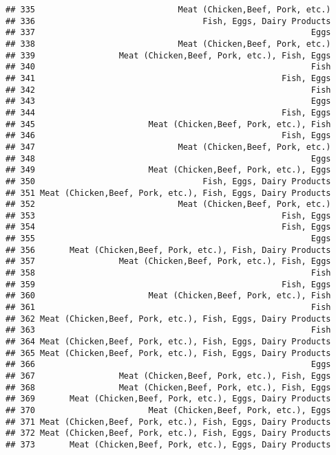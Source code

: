 \documentclass[
]{article}
\begin{document}
\begin{verbatim}
## 335                             Meat (Chicken,Beef, Pork, etc.)
## 336                                  Fish, Eggs, Dairy Products
## 337                                                        Eggs
## 338                             Meat (Chicken,Beef, Pork, etc.)
## 339                 Meat (Chicken,Beef, Pork, etc.), Fish, Eggs
## 340                                                        Fish
## 341                                                  Fish, Eggs
## 342                                                        Fish
## 343                                                        Eggs
## 344                                                  Fish, Eggs
## 345                       Meat (Chicken,Beef, Pork, etc.), Fish
## 346                                                  Fish, Eggs
## 347                             Meat (Chicken,Beef, Pork, etc.)
## 348                                                        Eggs
## 349                       Meat (Chicken,Beef, Pork, etc.), Eggs
## 350                                  Fish, Eggs, Dairy Products
## 351 Meat (Chicken,Beef, Pork, etc.), Fish, Eggs, Dairy Products
## 352                             Meat (Chicken,Beef, Pork, etc.)
## 353                                                  Fish, Eggs
## 354                                                  Fish, Eggs
## 355                                                        Eggs
## 356       Meat (Chicken,Beef, Pork, etc.), Fish, Dairy Products
## 357                 Meat (Chicken,Beef, Pork, etc.), Fish, Eggs
## 358                                                        Fish
## 359                                                  Fish, Eggs
## 360                       Meat (Chicken,Beef, Pork, etc.), Fish
## 361                                                        Fish
## 362 Meat (Chicken,Beef, Pork, etc.), Fish, Eggs, Dairy Products
## 363                                                        Fish
## 364 Meat (Chicken,Beef, Pork, etc.), Fish, Eggs, Dairy Products
## 365 Meat (Chicken,Beef, Pork, etc.), Fish, Eggs, Dairy Products
## 366                                                        Eggs
## 367                 Meat (Chicken,Beef, Pork, etc.), Fish, Eggs
## 368                 Meat (Chicken,Beef, Pork, etc.), Fish, Eggs
## 369       Meat (Chicken,Beef, Pork, etc.), Eggs, Dairy Products
## 370                       Meat (Chicken,Beef, Pork, etc.), Eggs
## 371 Meat (Chicken,Beef, Pork, etc.), Fish, Eggs, Dairy Products
## 372 Meat (Chicken,Beef, Pork, etc.), Fish, Eggs, Dairy Products
## 373       Meat (Chicken,Beef, Pork, etc.), Eggs, Dairy Products

\end{verbatim}
\end{document}
